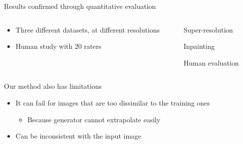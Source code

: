 \begin{frame}{Results confirmed through quantitative evaluation}

\begin{columns}[t]
 \begin{column}{0.5\textwidth}
\begin{itemize}
 \item Three different datasets, at different resolutions
 
 \vt
 
 \item Human study with 20 raters
 
 
\end{itemize}
  
 \end{column}
 \begin{column}{0.5\textwidth}
 \centering

Super-resolution

\vo

Inpainting

\vo

Human evaluation

\end{column}

 
\end{columns}




 
\end{frame}

\begin{frame}{Our method also has limitations}

\begin{itemize}
 \item It can fail for images that are too dissimilar to the training ones
 \begin{itemize}
 \item Because generator cannot extrapolate easily
 \end{itemize}
 \begin{center}
 \end{center}
 
 \item Can be inconsistent with the input image
 \begin{center}
 \end{center}
 
\end{itemize}
 
\end{frame}


